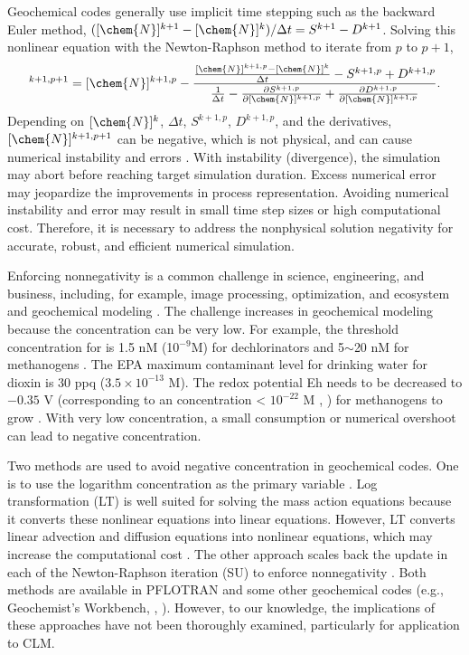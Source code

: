 \documentclass[gmd, manuscript]{copernicus}
\begin{document}
Geochemical codes generally use implicit time stepping such as the backward
Euler method, $([\chem{N}]^{k+1} - [\chem{N}]^k)/\Delta t = S^{k+1} - D^{k+1}$.
Solving this nonlinear equation with the Newton-Raphson method to iterate from
$p$ to $p+1$,   
\begin{equation}
[\chem{N}]^{k+1,p+1} = [\chem{N}]^{k+1,p} -
\frac{\frac{[\chem{N}]^{k+1,p}-[\chem{N}]^k}{\Delta t} - S^{k+1,p} + D^{k+1,p}}
{\frac{1}{\Delta t}  - \frac{\partial S^{k+1,p}}{\partial [\chem{N}]^{k+1,p}} +
\frac{\partial D^{k+1,p}}{\partial [\chem{N}]^{k+1,p}}}.
\label{eq:demo}
\end{equation}
Depending on $[\chem{N}]^k$, $\Delta t$, $S^{k+1,p}$, $D^{k+1,p}$, and the
derivatives, $[\chem{N}]^{k+1,p+1}$ can be negative, which is not physical, and
can cause numerical instability and errors \citep{Shampine2005}. With
instability (divergence), the simulation may abort before reaching target
simulation duration. Excess numerical error may jeopardize the improvements in
process representation. Avoiding numerical instability and error may result in
small time step sizes or high computational cost. Therefore, it is necessary to
address the nonphysical solution negativity for accurate, robust, and efficient numerical
simulation.  

Enforcing nonnegativity is a common challenge in science, engineering, and
business, including, for example, image processing, optimization, and ecosystem
and geochemical modeling
\citep{Antonelli2009,Broekhuizen2008,Bruggeman2007,Burchard2003,Burchard2005,Chen2009,Pierre2000,Shampine2005}.
The challenge increases in geochemical modeling because the concentration can
be very low. For example, the threshold concentration for  is 1.5
\unit{nM} (10$^{-9}$\unit{M}) for dechlorinators and 5$\sim$20 \unit{nM} for
methanogens \citep{Fennell1998}.  The EPA maximum contaminant level for
drinking water for dioxin is 30 \unit{ppq} ($3.5\times 10^{-13}$ \unit{M}). The
redox potential Eh needs to be decreased to $-0.35$ \unit{V} (corresponding to an
 concentration < $10^{-22}$ \unit{M} \citeauthor{Hungate1975},
\citeyear{Hungate1975}) for methanogens to grow \citep{Jarrell1985}. With very
low concentration, a small consumption or numerical overshoot can lead to
negative concentration.  

Two methods are used to avoid negative concentration in geochemical codes. One
is to use the logarithm concentration as the primary variable
\citep{Bethke2007,Hammond2003,Parkhurst1999}.  Log transformation (LT) is well
suited for solving the mass action equations because it converts these nonlinear
equations into linear equations. However, LT converts linear advection and
diffusion equations into nonlinear equations, which may increase the
computational cost \citep{Hammond2003}. The other approach scales back the
update in each of the Newton-Raphson iteration (SU) to enforce nonnegativity
\citep{Bethke2007,Hammond2003}. Both methods are available in PFLOTRAN \citep{Lichtner2015} and
some other geochemical codes (e.g., Geochemist's Workbench,
\citeauthor{Bethke2007}, \citeyear{Bethke2007}). However, to our knowledge, the
implications of these approaches have not been thoroughly examined,
particularly for application to CLM. 
\end{document}
